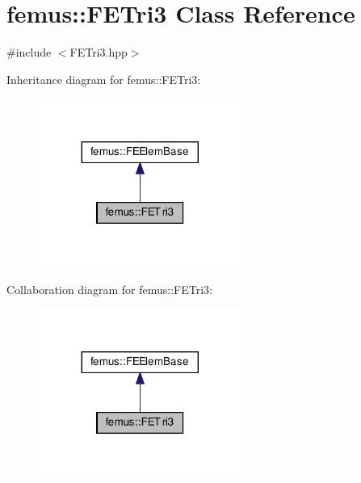 \hypertarget{classfemus_1_1_f_e_tri3}{}\section{femus\+:\+:F\+E\+Tri3 Class Reference}
\label{classfemus_1_1_f_e_tri3}


{\ttfamily \#include $<$F\+E\+Tri3.\+hpp$>$}



Inheritance diagram for femus\+:\+:F\+E\+Tri3\+:
\nopagebreak
\begin{figure}[H]
\begin{center}
\leavevmode
\includegraphics[width=188pt]{classfemus_1_1_f_e_tri3__inherit__graph}
\end{center}
\end{figure}


Collaboration diagram for femus\+:\+:F\+E\+Tri3\+:
\nopagebreak
\begin{figure}[H]
\begin{center}
\leavevmode
\includegraphics[width=188pt]{classfemus_1_1_f_e_tri3__coll__graph}
\end{center}
\end{figure}
